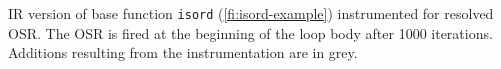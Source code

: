 \label{fig:isordfrom} IR version of base function {\tt isord} (\myfigure\ref{fi:isord-example}) instrumented for resolved OSR. The OSR is fired at the beginning of the loop body after 1000 iterations. Additions resulting from the instrumentation are in grey.
